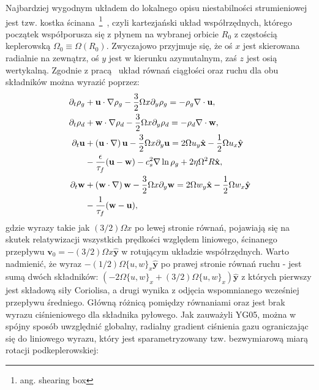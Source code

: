 Najbardziej wygodnym układem do lokalnego opisu niestabilności strumieniowej
jest tzw. kostka ścinana~\footnote{ang. shearing box}~\citep{HGB95}, czyli
kartezjański układ współrzędnych, którego początek współporusza się z płynem na
wybranej orbicie $R_0$ z częstością keplerowską $\Omega_0 \equiv
\Omega\left(R_0\right)$. Zwyczajowo przyjmuje się, że oś $x$ jest skierowana
radialnie na zewnątrz, oś $y$ jest w kierunku azymutalnym, zaś $z$ jest osią
wertykalną. Zgodnie z pracą~\cite*{YJ07} układ równań ciągłości oraz ruchu dla
obu składników można wyrazić poprzez:
%
\begin{align}
\partial_t \rho_g &+ \mathbf{u}\cdot\nabla\rho_g - \frac{3}{2}\Omega x\partial_y\rho_g 
 = -\rho_g\nabla\cdot\mathbf{u},\label{eqc1}\\
\partial_t \rho_d &+ \mathbf{w}\cdot\nabla\rho_d - \frac{3}{2}\Omega x\partial_y\rho_d 
 = -\rho_d\nabla\cdot\mathbf{w},\label{eqc2}\\
\partial_t \mathbf{u} &+ \left(\mathbf{u}\cdot\nabla\right)\mathbf{u} 
 - \frac{3}{2}\Omega x\partial_y\mathbf{u} 
 = 2\Omega u_y \hat{\mathbf{x}} -\frac{1}{2}\Omega u_x \hat{\mathbf{y}} \notag\\
 &- \frac{\epsilon}{\tau_f}(\mathbf{u}-\mathbf{w}) -c_s^2\nabla\ln\rho_g 
 +2\eta\Omega^2 R \hat{\mathbf{x}},\label{eqm1}\\
\partial_t \mathbf{w} &+ \left(\mathbf{w}\cdot\nabla\right)\mathbf{w} 
 - \frac{3}{2}\Omega x\partial_y\mathbf{w}
 = 2\Omega w_y \hat{\mathbf{x}} -\frac{1}{2}\Omega w_x \hat{\mathbf{y}} \notag\\
 &- \frac{1}{\tau_f}(\mathbf{w}-\mathbf{u}), \label{eqm2}
\end{align}
%
gdzie wyrazy takie jak $(3/2)\Omega x$ po lewej stronie równań, pojawiają się na
skutek relatywizacji wszystkich prędkości względem liniowego, ścinanego przepływu
$\mathbf{v}_0 = -(3/2)\Omega x \hat{\mathbf{y}}$ w rotującym układzie
współrzędnych. Warto nadmienić, że wyraz $-(1/2)\Omega \{u,w\}_x
\hat{\mathbf{y}}$ po prawej stronie równań ruchu - jest
sumą dwóch składników: $(-2\Omega \{u,w\}_x + (3/2)\Omega \{u,w\}_x)
\hat{\mathbf{y}}$ z których pierwszy jest składową siły Coriolisa, a drugi
wynika z odjęcia wspomnianego wcześniej przepływu średniego. Główną różnicą
pomiędzy równaniami  oraz  jest brak wyrazu ciśnieniowego
dla składnika pyłowego. Jak zauważyli YG05, można w spójny sposób uwzględnić
globalny, radialny gradient ciśnienia gazu ograniczając się do liniowego wyrazu,
który jest sparametryzowany tzw. bezwymiarową miarą rotacji podkeplerowskiej:

